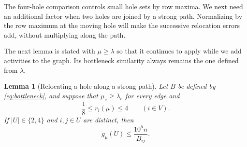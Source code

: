 \documentclass[11pt]{article}
\newtheorem{lemma}[theorem]{Lemma}
\theoremstyle{definition}
\theoremstyle{remark}
\numberwithin{equation}{section}
\begin{document}
The four-hole comparison controls small hole sets by row maxima. We
next need an additional factor when two holes are joined by a strong
path. Normalizing by the row maximum at the moving hole will make
the successive relocation errors add, without multiplying along the
path.

The next lemma is stated with $\mu\ge\lambda$ so that it continues to
apply while we add activities to the graph.  Its bottleneck similarity
always remains the one defined from $\lambda$.

\begin{lemma}[Relocating a hole along a strong path]
\label{lem:hole-relocation}
Let $B$ be defined by \eqref{eq:bottleneck}, and suppose that
$\mu_e\ge\lambda_e$ for every edge and
\[
 \frac18\le r_i(\mu)\le4\qquad(i\in V).
\]
If $|U|\in\{2,4\}$ and $i,j\in U$ are distinct, then
\begin{equation}
\label{eq:hole-relocation-bound}
 g_\mu(U)\le\frac{10^5n}{B_{ij}}.
\end{equation}
\end{lemma}
\end{document}
